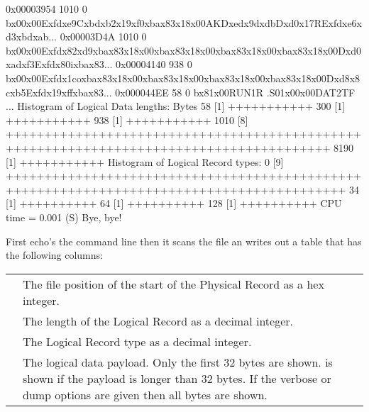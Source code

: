 \documentclass[letterpaper,10pt,english]{sphinxmanual}
\begin{document}
\begin{sphinxVerbatim}[commandchars=\\\{\}]
0x00003954      1010     0  b\PYGZdq{}\PYGZbs{}x00\PYGZbs{}x00E\PYGZbs{}xfd\PYGZbs{}xe9C\PYGZbs{}xbd\PYGZbs{}xb2\PYGZbs{}x19\PYGZbs{}xf0\PYGZbs{}xba\PYGZbs{}x83\PYGZbs{}x18\PYGZbs{}x00AK\PYGZsq{}\PYGZpc{}D\PYGZbs{}xed\PYGZbs{}x9d\PYGZbs{}xdbD\PYGZbs{}xd0\PYGZbs{}x17RE\PYGZbs{}xfd\PYGZbs{}xe6\PYGZbs{}xd3\PYGZbs{}xbd\PYGZbs{}xab\PYGZdq{}...
0x00003D4A      1010     0  b\PYGZsq{}\PYGZbs{}x00\PYGZbs{}x00E\PYGZbs{}xfd\PYGZbs{}x82\PYGZbs{}xd9\PYGZbs{}xba\PYGZbs{}x83\PYGZbs{}x18\PYGZbs{}x00\PYGZbs{}xba\PYGZbs{}x83\PYGZbs{}x18\PYGZbs{}x00\PYGZbs{}xba\PYGZbs{}x83\PYGZbs{}x18\PYGZbs{}x00\PYGZbs{}xba\PYGZbs{}x83\PYGZbs{}x18\PYGZbs{}x00D\PYGZbs{}xd0\PYGZbs{}xad\PYGZbs{}xf3E\PYGZbs{}xfd\PYGZbs{}x80i\PYGZbs{}xba\PYGZbs{}x83\PYGZsq{}...
0x00004140       938     0  b\PYGZsq{}\PYGZbs{}x00\PYGZbs{}x00E\PYGZbs{}xfd\PYGZbs{}x1co\PYGZbs{}xba\PYGZbs{}x83\PYGZbs{}x18\PYGZbs{}x00\PYGZbs{}xba\PYGZbs{}x83\PYGZbs{}x18\PYGZbs{}x00\PYGZbs{}xba\PYGZbs{}x83\PYGZbs{}x18\PYGZbs{}x00\PYGZbs{}xba\PYGZbs{}x83\PYGZbs{}x18\PYGZbs{}x00D\PYGZbs{}xd8\PYGZbs{}x8c\PYGZbs{}xb5E\PYGZbs{}xfd\PYGZbs{}x19\PYGZbs{}xff\PYGZbs{}xba\PYGZbs{}x83\PYGZsq{}...
0x000044EE        58     0  b\PYGZsq{}\PYGZbs{}x81\PYGZbs{}x00RUN1R .S01\PYGZbs{}x00\PYGZbs{}x00DAT2TF            \PYGZsq{}...
Histogram of Logical Data lengths:
Bytes
   58 [1] \textbar{} +++++++++++
  300 [1] \textbar{} +++++++++++
  938 [1] \textbar{} +++++++++++
 1010 [8] \textbar{} ++++++++++++++++++++++++++++++++++++++++++++++++++++++++++++++++++++++++++++++++++++++++
 8190 [1] \textbar{} +++++++++++
Histogram of Logical Record types:
  0 [9] \textbar{} ++++++++++++++++++++++++++++++++++++++++++++++++++++++++++++++++++++++++++++++++++++++++++
 34 [1] \textbar{} ++++++++++
 64 [1] \textbar{} ++++++++++
128 [1] \textbar{} ++++++++++
CPU time =    0.001 (S)
Bye, bye!
\end{sphinxVerbatim}

First  echo’s the command line then it scans the file an writes out a table that has the following columns:


\begin{savenotes}\sphinxattablestart
\centering
\begin{tabulary}{\linewidth}[t]{|T|T|}
\hline
{}\relax &\relax \\
\hline
{}
&
The file position of the start of the Physical Record as a hex integer.
\\
\hline
{}
&
The length of the Logical Record as a decimal integer.
\\
\hline
{}
&
The Logical Record type as a decimal integer.
\\
\hline
{}
&
The logical data payload. Only the first 32 bytes are shown.  is shown if the payload is longer than 32 bytes. If the verbose or dump options are given then all bytes are shown.
\\
\hline
\end{tabulary}
\par
\sphinxattableend\end{savenotes}
\end{document}
